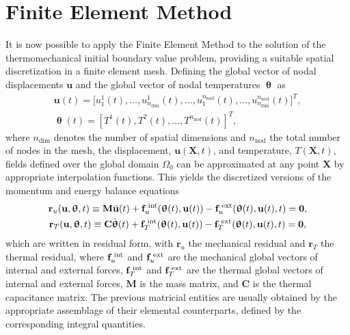 \section{Finite Element Method} \label{sec:fem_mech}

It is now possible to apply the Finite Element Method to the solution of the thermomechanical initial boundary value problem, providing a suitable spatial discretization in a finite element mesh.
Defining the global vector of nodal displacements \(\mathbf{u}\) and the global vector of nodal temperatures \(\bm{\uptheta}\) as
\begin{gather}
  \mathbf{u}(t) = \Big[ u_1^1(t),\dots,u^1_{n_\text{dim}}(t),\dots, u_1^{n_\text{nod}}(t),\dots,u^{n_\text{nod}}_{n_\text{dim}}(t)\Big]^T,\\
  \bm{\uptheta}(t) = \left[ T^1(t), T^2(t), \dots, T^{n_\text{nod}}(t)\right]^T,
\end{gather}
where \(n_\text{dim}\) denotes the number of spatial dimensions and \(n_\text{nod}\) the total number of nodes in the mesh, the displacement, $\bm{u}(\bm{X}, t)$, and temperature, \(T(\bm{X}, t)\), fields defined over the global domain $\Omega_0$ can be approximated at any point $\bm{X}$ by appropriate interpolation functions.
This yields the discretized versions of the momentum and energy balance equations
\begin{gather}
  \mathbf{r}_{u}(\mathbf{u}, \bm{\uptheta}, t)\equiv\mathbf{M} \ddot{\mathbf{u}}(t) +\mathbf{f}_u^\text{\;int}(\bm{\uptheta}(t), \mathbf{u}(t))-\mathbf{f}^\text{\;ext}_{u}(\bm{\uptheta}(t), \mathbf{u}(t), t)=\mathbf{0}, \label{eq:disc_momentum_balance} \\
  \mathbf{r}_{T}(\mathbf{u}, \bm{\uptheta}, t)\equiv \mathbf{C} \dot{\bm{\uptheta}}(t)  + \mathbf{f}_T^\text{\;int}(\bm{\uptheta}(t), \mathbf{u}(t))-\mathbf{f}^\text{\;ext}_{T}(\bm{\uptheta}(t), \mathbf{u}(t), t)=\mathbf{0}, \label{eq:disc_energy_balance}
\end{gather}
which are written in residual form, with $\mathbf r_u$ the mechanical residual and $\mathbf r_T$ the thermal residual, where $\mathbf{f}_u^\text{\;int}$ and $\mathbf{f}^\text{\;ext}_{u}$ are the mechanical global vectors of internal and external forces, $\mathbf{f}_T^\text{\;int}$ and $\mathbf{f}^\text{\;ext}_{T}$ are the thermal global vectors of internal and external forces, $\mathbf{M}$ is the mass matrix, and \(\mathbf{C}\) is the thermal capacitance matrix.
The previous matricial entities are usually obtained by the appropriate assemblage of their elemental counterparts, defined by the corresponding integral quantities.

